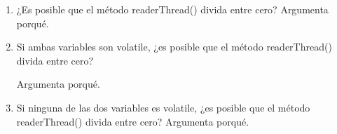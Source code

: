 \begin{enumerate}
    \begin{enumerate}
        \item ¿Es posible que el método readerThread() divida entre cero? Argumenta porqué.

        \item Si ambas variables son volatile, ¿es posible que el método readerThread() divida entre cero?
        
        Argumenta porqué.

        \item Si ninguna de las dos variables es volatile, ¿es posible que el método readerThread() divida entre cero? Argumenta porqué.
    \end{enumerate}
    
\end{enumerate}
